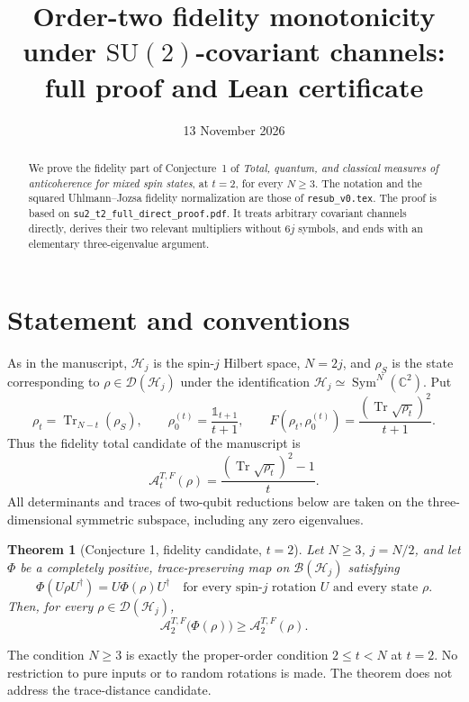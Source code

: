 \documentclass[11pt,a4paper]{article}
\title{Order-two fidelity monotonicity\\under $\mathrm{SU}(2)$-covariant channels:\\full proof and Lean certificate}
\author{}
\date{13 November 2026}
\DeclareMathOperator{\Tr}{Tr}
\DeclareMathOperator{\Sym}{Sym}
\newcommand{\A}{\mathcal A}
\newcommand{\id}{\mathds{1}}
\newtheorem{theorem}{Theorem}
\begin{document}
\maketitle
\begin{abstract}
We prove the fidelity part of Conjecture~1 of \emph{Total, quantum, and
classical measures of anticoherence for mixed spin states}, at $t=2$, for
every $N\ge3$. The notation and the squared Uhlmann--Jozsa fidelity
normalization are those of \texttt{resub\_v0.tex}. The proof is based on
\texttt{su2\_t2\_full\_direct\_proof.pdf}. It treats arbitrary covariant
channels directly, derives their two relevant multipliers without $6j$
symbols, and ends with an elementary three-eigenvalue argument.
\end{abstract}

\section{Statement and conventions}
As in the manuscript, $\mathcal H_j$ is the spin-$j$ Hilbert space,
$N=2j$, and $\rho_S$ is the state corresponding to
$\rho\in\mathcal D(\mathcal H_j)$ under the identification
$\mathcal H_j\simeq\Sym^N(\mathbb C^2)$. Put
\[
 \rho_t=\Tr_{N-t}(\rho_S),\qquad
 \rho_0^{(t)}=\frac{\id_{t+1}}{t+1},\qquad
 F(\rho_t,\rho_0^{(t)})=\frac{(\Tr\sqrt{\rho_t})^2}{t+1}.
\]
Thus the fidelity total candidate of the manuscript is
\begin{equation}\label{eq:candidate}
 \A_t^{T,F}(\rho)=\frac{(\Tr\sqrt{\rho_t})^2-1}{t}.
\end{equation}
All determinants and traces of two-qubit reductions below are taken on
the three-dimensional symmetric subspace, including any zero eigenvalues.

\begin{theorem}[Conjecture 1, fidelity candidate, $t=2$]\label{thm:main}
Let $N\ge3$, $j=N/2$, and let $\Phi$ be a completely positive,
trace-preserving map on $\mathcal B(\mathcal H_j)$ satisfying
\[
 \Phi(U\rho U^\dagger)=U\Phi(\rho)U^\dagger
 \quad\text{for every spin-$j$ rotation $U$ and every state $\rho$.}
\]
Then, for every $\rho\in\mathcal D(\mathcal H_j)$,
\begin{equation}\label{eq:main}
 \boxed{\A_2^{T,F}\bigl(\Phi(\rho)\bigr)\ge\A_2^{T,F}(\rho).}
\end{equation}
\end{theorem}
The condition $N\ge3$ is exactly the proper-order condition $2\le t<N$
at $t=2$. No restriction to pure inputs or to random rotations is made.
The theorem does not address the trace-distance candidate.
\end{document}
